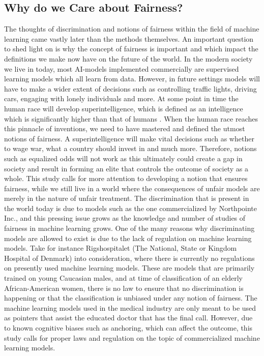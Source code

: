 \documentclass[11pt, fleqn, titlepage]{article}
\begin{document}
	\subsection{Why do we Care about Fairness?}\label{why_do_we_care}
	The thoughts of discrimination and notions of fairness within the field of machine learning came vastly later than the methods themselves. An important question to shed light on is why the concept of fairness is important and which impact the definitions we make now have on the future of the world. In the modern society we live in today, most AI-models implemented commercially are supervised learning models which all learn from data. However, in future settings models will have to make a wider extent of decisions such as controlling traffic lights, driving cars, engaging with lonely individuals and more. At some point in time the human race will develop superintelligence, which is defined as an intelligence which is significantly higher than that of humans \cite{superint}. When the human race reaches this pinnacle of inventions, we need to have mastered and defined the utmost notions of fairness. A superintelligence will make vital decisions such as whether to wage war, what a country should invest in and much more. Therefore, notions such as equalized odds will not work as this ultimately could create a gap in society and result in forming an elite that controls the outcome of society as a whole. This study calls for more attention to developing a notion that ensures fairness, while we still live in a world where the consequences of unfair models are merely in the nature of unfair treatment. The discrimination that is present in the world today is due to models such as the one commercialized by Northpointe Inc., and this pressing issue grows as the knowledge and number of studies of fairness in machine learning grows. One of the many reasons why discriminating models are allowed to exist is due to the lack of regulation on machine learning models. Take for instance Rigshospitalet (The National, State or Kingdom Hospital of Denmark) into consideration, where there is currently no regulations on presently used  machine learning models. These are models that are primarily trained on young Caucasian males, and at time of classification of an elderly African-American women, there is no law to ensure that no discrimination is happening or that the classification is unbiased under any notion of fairness. The machine learning models used in the medical industry are only meant to be used as pointers that assist the educated doctor that has the final call. However, due to known cognitive biases such as anchoring, which can affect the outcome, this study calls for proper laws and regulation on the topic of commercialized machine learning models.
\end{document}
